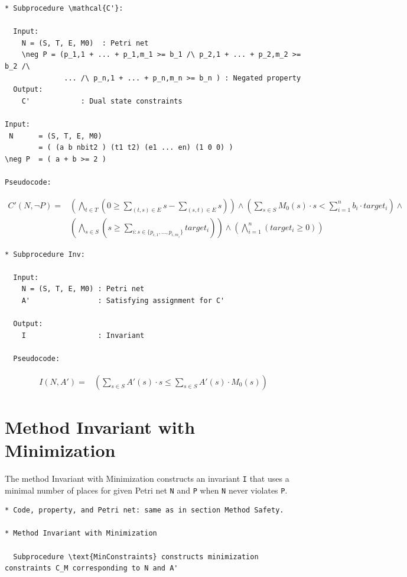 \documentclass{llncs}
\begin{document}
\newpage
\begin{verbatim}
* Subprocedure \mathcal{C'}:

  Input:
    N = (S, T, E, M0)  : Petri net
    \neg P = (p_1,1 + ... + p_1,m_1 >= b_1 /\ p_2,1 + ... + p_2,m_2 >= b_2 /\
              ... /\ p_n,1 + ... + p_n,m_n >= b_n ) : Negated property
  Output:
    C'            : Dual state constraints

Input:
 N      = (S, T, E, M0)
        = ( (a b nbit2 ) (t1 t2) (e1 ... en) (1 0 0) )
\neg P  = ( a + b >= 2 )

Pseudocode:
\end{verbatim}

\begin{align*}
  C'(N, \neg P) =& \left( \bigwedge_{t \in T} \left( 0 \ge
                      \sum_{(t, s) \in E} s
                    - \sum_{(s, t) \in E} s \right) \right) \land
     \left( \sum_{s \in S} M_0(s) \cdot s <
       \sum_{i=1}^n b_i \cdot target_i \right) \land \\
     & \left( \bigwedge_{s \in S} \left ( s \ge 
       \sum_{i : s \in \{ p_{i,1}, \ldots, p_{i,m_i} \} } target_i \right) \right) \land
     \left( \bigwedge_{i=1}^n \left( target_i \ge 0 \right) \right)
\end{align*}

\begin{verbatim}
* Subprocedure Inv:

  Input:
    N = (S, T, E, M0) : Petri net
    A'                : Satisfying assignment for C'

  Output:
    I                 : Invariant

  Pseudocode:
\end{verbatim}

\begin{align*}
  I(N, A') =& \left( \sum_{s \in S} A'(s) \cdot s \le
                     \sum_{s \in S} A'(s) \cdot M_0(s) \right)
\end{align*}

\newpage
\section{Method Invariant with Minimization}

The method Invariant with Minimization constructs an invariant \verb=I=
that uses a minimal number of places for given Petri net \verb=N= and
\verb=P= when \verb=N= never violates \verb=P=. 

\begin{verbatim}
* Code, property, and Petri net: same as in section Method Safety.

* Method Invariant with Minimization

  Subprocedure \text{MinConstraints} constructs minimization constraints C_M corresponding to N and A'
\end{verbatim}
\end{document}
